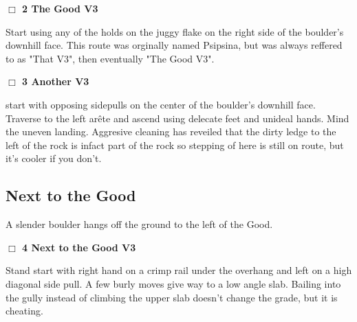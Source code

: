	\begin{multicols}{2}

\needspace{2em}
\label{rt:The Good}
\colorbox{green!20}{
\parbox{0.95\linewidth}{
\hspace{-1ex}\textbf{$\Box$
2 The Good V3  
}}}
\begin{adjustwidth}{1.3em}{}			

Start using any of the holds on the juggy flake on the right side of the boulder's downhill face. This route was orginally named Psipsina, but was always reffered to as "That V3", then eventually "The Good V3".
\end{adjustwidth}




\needspace{2em}
\label{rt:Another}
\colorbox{green!20}{
\parbox{0.95\linewidth}{
\hspace{-1ex}\textbf{$\Box$
3 Another V3  \warn
}}}
\begin{adjustwidth}{1.3em}{}			

start with opposing sidepulls on the center of the boulder's downhill face. Traverse to the left arête and ascend using delecate feet and unideal hands. Mind the uneven landing. Aggresive cleaning has reveiled that the dirty ledge to the left of the rock is infact part of the rock so stepping of here is still on route, but it's cooler if you don't.
\end{adjustwidth}





\needspace{10em}
\subsection*{Next to the Good}\label{bf:Next to the Good}

A slender boulder hangs off the ground to the left of the Good.\\



\needspace{2em}
\label{rt:Next to the Good}
\colorbox{green!20}{
\parbox{0.95\linewidth}{
\hspace{-1ex}\textbf{$\Box$
4 Next to the Good V3  \warn
}}}
\begin{adjustwidth}{1.3em}{}			

Stand start with right hand on a crimp rail under the overhang and left on a high diagonal side pull. A few burly moves give way to a low angle slab. Bailing into the gully instead of climbing the upper slab doesn't change the grade, but it is cheating.
\end{adjustwidth}





\end{multicols}
